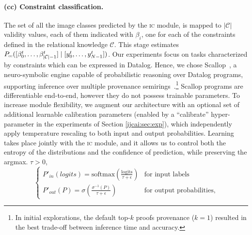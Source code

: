 	\paragraph{{\sc (cc)} Constraint classification.} The set of all the image classes  %
predicted by the \textsc{ic} module, is mapped to $|\mathcal{C}|$ validity values, %
each of them indicated with $\beta_i$, one for each of the constraints defined in the relational knowledge $\mathcal{C}$. This stage estimates $P_{\text{\sc\tiny cc}}([\beta_{0}^{t}, \ldots, \beta_{|\mathcal{C}| - 1}^{t}] \mid [y_{0}^{t}, \ldots, y_{N-1}^{t}])$. %
Our experiments focus on tasks characterized by constraints which can be expressed in Datalog.
Hence, we chose Scallop~\cite{li2023scallop}, a neuro-symbolic engine capable of probabilistic reasoning over Datalog programs, supporting inference over multiple provenance semirings~\cite{green2007provenance}.\footnote{In initial explorations, the default top-$k$ proofs provenance ($k=1$) resulted in the best trade-off between inference time and accuracy.} %
Scallop programs are differentiable end-to-end, however they do not possess trainable parameters. To increase module flexibility, we augment our architecture with an optional set of additional learnable calibration parameters %
(enabled by a ``calibrate'' hyper-parameter in the experiments of Section \ref{ijcai:sec:exp}), which independently apply temperature rescaling to both input and output probabilities. %
Learning takes place jointly with the \textsc{ic} module, and it allows us to control both the entropy of the distributions and the confidence of prediction, while preserving the argmax.
\iffalse
$\tau > 0$,
\begin{equation}
	\begin{cases}
		P'_{in}(logits) = \mathrm{softmax}\left(\frac{\mathrm{logits}}{\tau + \epsilon}\right) & \text{for input labels}\\
		P'_{out}(P) = \sigma\left(\frac{\sigma^{-1}(P)}{\tau + \epsilon}\right) & \text{for output probabilities},
	\end{cases}
\end{equation}
